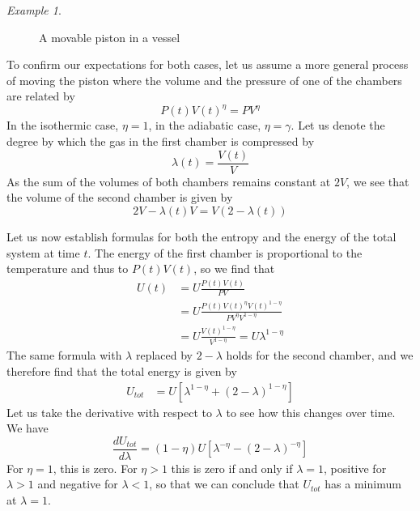 \documentclass[a4paper, draft]{article}
\theoremstyle{own}
\theoremstyle{remark}
\newtheorem{example}{Example}[section]
\begin{document}
\begin{example}
\begin{figure}[ht]
\begin{center}
\caption{A movable piston in a vessel}
\label{fig:Piston}
\end{center}
\end{figure}

To confirm our expectations for both cases, let us assume a more general process of moving the piston where the volume and the pressure of one of the chambers are related by
$$
P(t) V(t)^\eta = PV^\eta
$$
In the isothermic case, $\eta = 1$, in the adiabatic case, $\eta = \gamma$. Let us denote the degree by which the gas in the first chamber is compressed by
$$
\lambda(t) = \frac{V(t)}{V}
$$
As the sum of the volumes of both chambers remains constant at $2V$, we see that the volume of the second chamber is given by
$$
2 V - \lambda(t) V = V ( 2 - \lambda(t))
$$

Let us now establish formulas for both the entropy and the energy of the total system at time $t$. The energy of the first chamber is proportional to the temperature and thus to $P(t) V(t)$, so we find that
\begin{align*}
U(t) &= U \frac{P(t) V(t)}{PV} \\
&= U \frac{P(t) V(t)^{\eta} V(t)^{1 -\eta}}{PV^{\eta} V^{1 -\eta}} \\
&= U \frac{V(t)^{1 -\eta}}{V^{1 -\eta}} = U \lambda^{1 - \eta}
\end{align*}
The same formula with $\lambda$ replaced by $2 - \lambda$ holds for the second chamber, and we therefore find that the total energy is given by
\begin{align*}
U_{tot} &= U [ \lambda^{1 - \eta} +  (2 - \lambda)^{1 - \eta} ]
\end{align*}
Let us take the derivative with respect to $\lambda$ to see how this changes over time. We have
$$
\frac{dU_{tot}}{d\lambda} = (1 - \eta)  U [ \lambda^{-\eta} - (2 - \lambda)^{-\eta} ]
$$
For $\eta = 1$, this is zero. For $\eta > 1$ this is zero if and only if $\lambda = 1$, positive for $\lambda > 1$ and negative for $\lambda < 1$, so that we can conclude that $U_{tot}$ has a minimum at $\lambda = 1$. 


\end{example}
\end{document}
